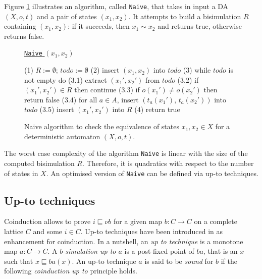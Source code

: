 \documentclass{llncs}
\begin{document}
Figure \ref{fig:naive} illustrates an algorithm, called \texttt{Naive}, that takes in input a DA $(X, o,t )$ and a pair of states $(x_1,x_2)$. It attempts to build a bisimulation $R$ containing $(x_1,x_2)$: if it succeeds, then $x_1\sim x_2$ and  returns true, otherwise returns false.
\begin{figure}[t]
\centering
\underline{\texttt{Naive} $(x_1,x_2)$}
\begin{codeNT}
(1) $R := \emptyset$; $todo := \emptyset$
(2) insert $(x_1,x_2)$ into $todo$
(3) while $todo$ is not empty do 
   (3.1)  extract $(x_1',x_2')$ from $todo$
   (3.2)  if $(x_1',x_2')\in R$ then continue
   (3.3)  if $o(x_1')\neq o(x_2')$ then return false
   (3.4)  for all $a\in A$, 
             insert $(t_a(x_1'),\,t_a(x_2'))$ into $todo$
   (3.5)  insert $(x_1',x_2')$ into $R$ 
(4) return true
\end{codeNT}
\caption{Naive algorithm to check the equivalence of states $x_1,x_2\in X$ for a deterministic automaton $(X, o,t)$.}
\label{fig:naive}
\end{figure}
%

The worst case complexity of the algorithm \texttt{Naive} is linear with the size of the computed bisimulation $R$. Therefore, it is quadratics with respect to the number of states in $X$. An optimised version of \texttt{Naive} can be defined via up-to techniques.


\subsection{Up-to techniques}
Coinduction allows to prove $i\sqsubseteq \nu b$ for a given map $b \colon C \to C$ on a complete lattice $C$ and some $i\in C$. Up-to techniques have been introduced in \cite{} as enhancement for coinduction. In a nutshell, an \emph{up to technique} is a monotone map $a \colon C \to C$. A \emph{$b$-simulation up to $a$} is a post-fixed point of $ba$, that is an $x$ such that $x\sqsubseteq ba(x)$. An up-to technique $a$ is said to be \emph{sound} for $b$ if the following \emph{coinduction up to} principle holds.
\end{document}
